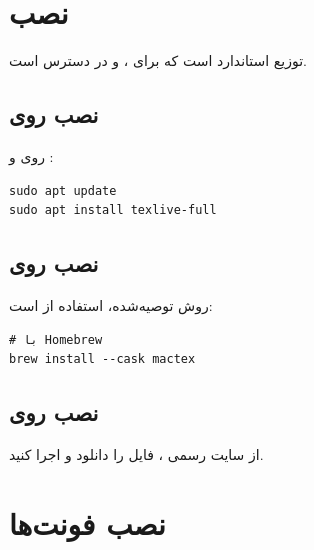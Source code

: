
\section{نصب }
\label{sec:installation-texlive}

 توزیع استاندارد  است
که برای ،  و 
در دسترس است.

\subsection{نصب روی }
\label{sec:installation-texlive-linux}

روی  و :

\begin{latin}
\begin{verbatim}
sudo apt update
sudo apt install texlive-full
\end{verbatim}
\end{latin}


\subsection{نصب روی }
\label{sec:installation-texlive-macos}

روش توصیه‌شده، استفاده از  است:

\begin{latin}
\begin{verbatim}
# با Homebrew
brew install --cask mactex
\end{verbatim}
\end{latin}

\subsection{نصب روی }
\label{sec:installation-texlive-windows}

از سایت رسمی ، فایل 
را دانلود و اجرا کنید.

\section{نصب فونت‌ها}
\label{sec:installation-fonts}

